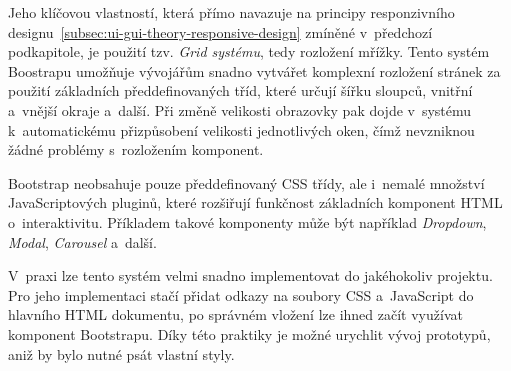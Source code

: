 Jeho klíčovou vlastností, která přímo navazuje na principy responzivního designu~\ref{subsec:ui-gui-theory-responsive-design} zmíněné v~předchozí podkapitole, je použití tzv. \textit{Grid systému}, tedy rozložení mřížky. Tento systém Boostrapu umožňuje vývojářům snadno vytvářet komplexní rozložení stránek za použití základních předdefinovaných tříd, které určují šířku sloupců, vnitřní a~vnější okraje a~další. Při změně velikosti obrazovky pak dojde v~systému k~automatickému přizpůsobení velikosti jednotlivých oken, čímž nevzniknou žádné problémy s~rozložením komponent.

Bootstrap neobsahuje pouze předdefinovaný CSS třídy, ale i~nemalé množství JavaScriptových pluginů, které rozšiřují funkčnost základních komponent HTML o~interaktivitu. Příkladem takové komponenty může být například \textit{Dropdown}, \textit{Modal}, \textit{Carousel} a~další.

V~praxi lze tento systém velmi snadno implementovat do jakéhokoliv projektu. Pro jeho implementaci stačí přidat odkazy na soubory CSS a~JavaScript do hlavního HTML dokumentu, po správném vložení lze ihned začít využívat komponent Bootstrapu. Díky této praktiky je možné urychlit vývoj prototypů, aniž by bylo nutné psát vlastní styly.

\endinput